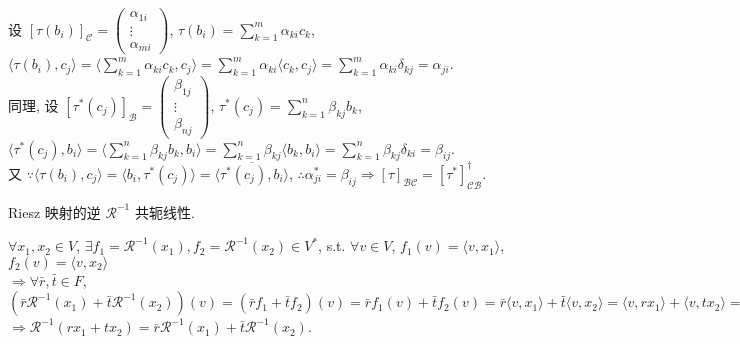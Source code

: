 \documentclass{note}
\begin{document}
\begin{pf}
\begin{itemize}
        设 $[\tau(b_i)]_{\mathcal{C}}=\begin{pmatrix}
            \alpha_{1i}\\
            \vdots\\
            \alpha_{mi}
        \end{pmatrix}$, $\tau(b_i)=\sum_{k=1}^m\alpha_{ki}c_k$, $\langle\tau(b_i),c_j\rangle=\langle\sum_{k=1}^m\alpha_{ki}c_k,c_j\rangle=\sum_{k=1}^m\alpha_{ki}\langle c_k,c_j\rangle=\sum_{k=1}^m\alpha_{ki}\delta_{kj}=\alpha_{ji}$.\\
        同理, 设 $[\tau^*(c_j)]_{\mathcal{B}}=\begin{pmatrix}
            \beta_{1j}\\
            \vdots\\
            \beta_{nj}
        \end{pmatrix}$, $\tau^*(c_j)=\sum_{k=1}^n\beta_{kj}b_k$, $\langle \tau^*(c_j),b_i\rangle=\langle\sum_{k=1}^n\beta_{kj}b_k,b_i\rangle=\sum_{k=1}^n\beta_{kj}\langle b_k,b_i\rangle=\sum_{k=1}^n\beta_{kj}\delta_{ki}=\beta_{ij}$.\\
        又 $\because\langle\tau(b_i),c_j\rangle=\langle b_i,\tau^*(c_j)\rangle=\overline{\langle\tau^*(c_j),b_i\rangle}$, $\therefore\alpha_{ji}^*=\beta_{ij}\Longrightarrow[\tau]_{\mathcal{BC}}=[\tau^*]_{\mathcal{CB}}^{\dagger}$.
    \end{itemize}
\end{pf}

\begin{cor}\label{inverse Riesz conjugate linear}
    Riesz 映射的逆 $\mathcal{R}^{-1}$ 共轭线性.
\end{cor}
\begin{pf}
    $\forall x_1,x_2\in V$, $\exists f_1=\mathcal{R}^{-1}(x_1),f_2=\mathcal{R}^{-1}(x_2)\in V^*$, s.t. $\forall v\in V$, $f_1(v)=\langle v,x_1\rangle$, $f_2(v)=\langle v,x_2\rangle$\\
    $\Longrightarrow\forall\bar{r},\bar{t}\in F$, $(\bar{r}\mathcal{R}^{-1}(x_1)+\bar{t}\mathcal{R}^{-1}(x_2))(v)=(\bar{r}f_1+\bar{t}f_2)(v)=\bar{r}f_1(v)+\bar{t}f_2(v)=\bar{r}\langle v,x_1\rangle+\bar{t}\langle v,x_2\rangle=\langle v,rx_1\rangle+\langle v,tx_2\rangle=\langle v,rx_1+tx_2\rangle=\mathcal{R}^{-1}(rx_1+rx_2)(v)$\\
    $\Longrightarrow\mathcal{R}^{-1}(rx_1+tx_2)=\bar{r}\mathcal{R}^{-1}(x_1)+\bar{t}\mathcal{R}^{-1}(x_2)$.
\end{pf}
\end{document}
